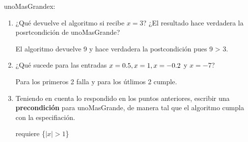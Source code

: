 \begin{proc}{unoMasGrande}{\In x: \float}{\float}
\end{proc}

\begin{enumerate}[label=\alph*)]
      \item ¿Qué devuelve el algoritmo si recibe $x = 3$? ¿El resultado hace verdadera la posrtcondición de unoMasGrande?

            El algoritmo devuelve 9 y hace verdadera la postcondición pues 9 > 3.

      \item ¿Qué sucede para las entradas $x = 0\text{.}5, x = 1, x = -0\text{.}2$ y $x = -7$?

            Para los primeros 2 falla y para los útlimos 2 cumple.

      \item Teniendo en cuenta lo respondido en los puntos anteriores, escribir una \textbf{precondición} para unoMasGrande, de manera tal que el algoritmo cumpla con la especifiación.

            requiere \{$|x| > 1$\}
\end{enumerate}


